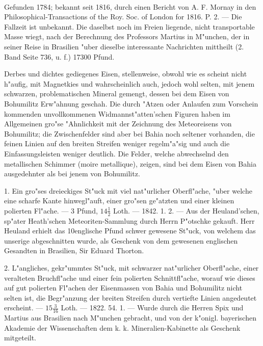 \documentclass[a4paper, 11pt, oneside, polutonikogreek, german]{article}
\begin{document}
\paragraph{}
Gefunden 1784; bekannt seit 1816, durch einen Bericht von A. F. Mornay in den Philosophical-Transactions of the Roy. Soc. of London for 1816. P. 2. --- Die Fallzeit ist unbekannt. Die daselbst noch im Freien liegende, nicht transportable Masse wiegt, nach der Berechnung des Professors Martius in M"unchen, der in seiner Reise in Brasilien "uber dieselbe interessante Nachrichten mittheilt (2. Band Seite 736, u. f.) 17300 Pfund.

Derbes und dichtes gediegenes Eisen, stellenweise, obwohl wie es scheint nicht h"aufig, mit Magnetkies und wahrscheinlich auch, jedoch wohl selten, mit jenem schwarzen, problematischen Mineral gemengt, dessen bei dem Eisen von Bohumilitz Erw"ahnung geschah. Die durch "Atzen oder Anlaufen zum Vorschein kommenden unvollkommenen Widmannst"atten'schen Figuren haben im Allgemeinen gro"se "Ahnlichkeit mit der Zeichnung des Meteoreisens von Bohumilitz; die Zwischenfelder sind aber bei Bahia noch seltener vorhanden, die feinen Linien auf den breiten Streifen weniger regelm"a"sig und auch die Einfassungsleisten weniger deutlich. Die Felder, welche abwechselnd den metallischen Schimmer (moire metallique), zeigen, sind bei dem Eisen von Bahia ausgedehnter als bei jenem von Bohumilitz.

1. Ein gro"ses dreieckiges St"uck mit viel nat"urlicher Oberfl"ache, "uber welche eine scharfe Kante hinwegl"auft, einer gro"sen ge"atzten und einer kleinen polierten Fl"ache. --- 3 Pfund, $14\frac{1}{2}$ Loth. --- 1842. 1. 2. --- Aus der Heuland'schen, sp"ater Heath'schen Meteoriten-Sammlung durch Herrn P"otschke gekauft. Herr Heuland erhielt das 10englische Pfund schwer gewesene St"uck, von welchem das unserige abgeschnitten wurde, als Geschenk von dem gewesenen englischen Gesandten in Brasilien, Sir Eduard Thorton.

2. L"angliches, gekr"ummtes St"uck, mit schwarzer nat"urlicher Oberfl"ache, einer veralteten Bruchfl"ache und einer fein polierten Schnittfl"ache, worauf wie dieses auf gut polierten Fl"achen der Eisenmassen von Bahia und Bohumilitz nicht selten ist, die Begr"anzung der breiten Streifen durch vertiefte Linien angedeutet erscheint. --- $15\frac{3}{16}$ Loth. --- 1822. 54. 1. --- Wurde durch die Herren Spix und Martius aus Brasilien nach M"unchen gebracht, und von der k"onigl. bayerischen Akademie der Wissenschaften dem k. k. Mineralien-Kabinette als Geschenk mitgeteilt.
\end{document}
